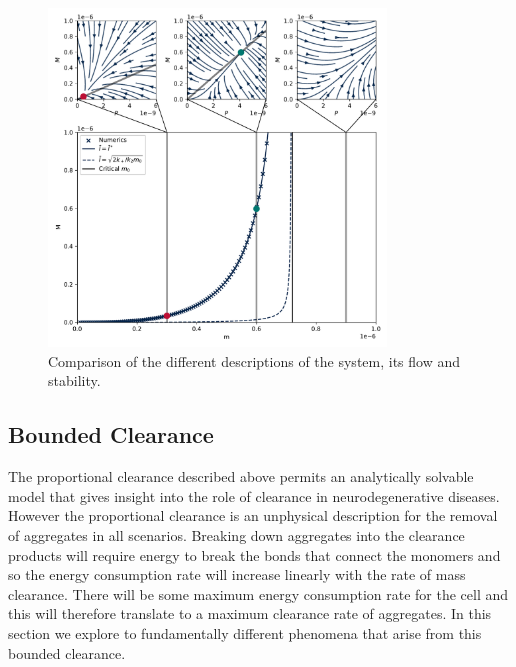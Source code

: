\begin{figure}
    \centering
    \includegraphics[width=0.8\textwidth]{figures/4-agg-figs/propClearSummary.pdf}
    \caption{Comparison of the different descriptions of the system, its flow and stability.}
    \label{fig:4-steadyConstClear}
\end{figure}

\subsection{Bounded Clearance}\label{subsec:4-boundedclearance}

The proportional clearance described above permits an analytically solvable model that gives insight into the role of clearance in neurodegenerative diseases. However the proportional clearance is an unphysical description for the removal of aggregates in all scenarios. Breaking down aggregates into the clearance products will require energy to break the bonds  that connect the monomers and so the energy consumption rate will increase linearly with the rate of mass clearance. There will be some maximum energy consumption rate for the cell and this will therefore translate to a maximum clearance rate of aggregates. In this section we explore to fundamentally different phenomena that arise from this bounded clearance.

